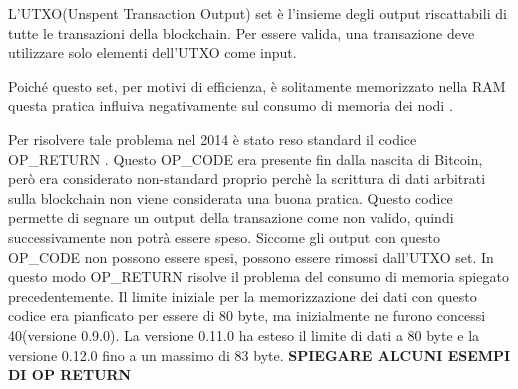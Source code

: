 L'UTXO(Unspent Transaction Output) set è l'insieme degli output riscattabili di tutte le transazioni della blockchain. Per essere valida, una transazione deve
utilizzare solo elementi dell'UTXO come input.

Poiché questo set, per motivi di efficienza, è solitamente memorizzato nella RAM \cite{utxo} questa pratica influiva negativamente sul consumo di memoria dei nodi \cite{stresstest}.

Per risolvere tale problema nel 2014 è stato reso standard il codice OP\_RETURN \cite{opreturnstandard} . Questo OP\_CODE era presente fin dalla nascita di Bitcoin, però era considerato non-standard proprio perchè la scrittura di dati arbitrati sulla blockchain non viene considerata una buona pratica. Questo codice permette di segnare un output della transazione come non valido, quindi successivamente non potrà essere speso. Siccome gli output con questo OP\_CODE non possono essere spesi, possono essere rimossi dall'UTXO set. In questo modo OP\_RETURN risolve il problema del consumo di memoria spiegato precedentemente. Il limite iniziale per la memorizzazione dei dati con questo codice era pianficato per essere di 80 byte, ma inizialmente ne furono concessi 40(versione 0.9.0).  La versione 0.11.0 \cite{v11} ha esteso il limite di dati a 80 byte e la versione 0.12.0 \cite{v12} fino a un massimo di 83 byte. 
\textbf{SPIEGARE ALCUNI ESEMPI DI OP RETURN}
